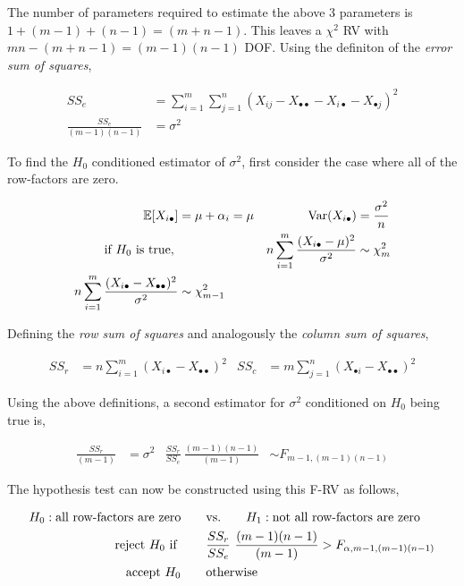 The number of parameters required to estimate the above 3 parameters is $ 1 + (m-1) + (n-1) = (m+n-1)$. This leaves a $ \chi^2 $ RV with $ mn - (m+n-1) = (m-1)(n-1) $ DOF. Using the definiton of the \textit{error sum of squares},

\begin{align}
	SS_e &=	\sum\limits_{i = 1}^{m} \sum\limits_{j = 1}^{n} (X_{ij} - X_{\bullet \bullet} - X_{i \bullet} - X_{\bullet j})^2\\
	\frac{SS_e}{(m-1)(n-1)} &= \sigma^2
\end{align}

To find the $ H_0 $ conditioned estimator of $ \sigma^2 $, first consider the case where all of the row-factors are zero.

\begin{align}
	\mathbb{E}[X_{i\bullet}] &= \mu + \alpha_i = \mu & \mathrm{Var}(X_{i\bullet}) &= \frac{\sigma^2}{n} \nonumber \\
	\text{if $ H_0 $ is true, } && n\sum\limits_{i = 1}^{m} \frac{(X_{i\bullet}  - \mu)^2}{\sigma^2} &\sim \chi^2_{m} \\
	n\sum\limits_{i = 1}^{m} \frac{(X_{i\bullet}  - X_{\bullet \bullet})^2}{\sigma^2} &\sim \chi^2_{m-1}
\end{align}

Defining the \textit{row sum of squares} and analogously the \textit{column sum of squares},

\begin{align}
	SS_r &= n\sum\limits_{i = 1}^{m} (X_{i\bullet}  - X_{\bullet \bullet})^2 & SS_c &= m\sum\limits_{j = 1}^{n} (X_{\bullet i}  - X_{\bullet \bullet})^2 
\end{align}

Using the above definitions, a second estimator for $ \sigma^2 $ conditioned on $ H_0 $ being true is,

\begin{align}
	\frac{SS_r}{(m-1)} &= \sigma^2 & \frac{SS_r}{SS_e}\ \frac{(m-1)(n-1)}{(m-1)} &\sim F_{m-1, (m-1) (n-1)}
\end{align}

The hypothesis test can now be constructed using this F-RV as follows,

\begin{align}
	H_0 : \text{all row-factors are zero} \qquad &\text{vs.} \qquad H_1 : \text{not all row-factors are zero} \nonumber \\
	\text{reject $ H_0 $ if } \qquad & \frac{SS_r}{SS_e}\ \frac{(m-1)(n-1)}{(m-1)} > F_{\alpha, m-1, (m-1) (n-1)} \nonumber \\
	\text{accept $ H_0 $} \qquad & \text{otherwise}
\end{align}

